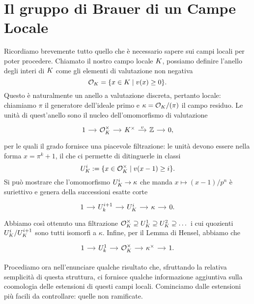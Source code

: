 \section{Il gruppo di Brauer di un Campe Locale}
Ricordiamo brevemente tutto quello che è necessario sapere sui campi locali per poter procedere. Chiamato il nostro campo locale $ K $, possiamo definire l'anello degli interi di $ K $ come gli elementi di valutazione non negativa
\[ \mathcal{O}_{K} = \{ x \in K \mid v(x)\geq 0 \}. \]
Questo è naturalmente un anello a valutazione discreta, pertanto locale: chiamiamo $ \pi $ il generatore dell'ideale primo e $ \kappa = \mathcal{O}_{K}/(\pi) $ il campo residuo. Le unità di quest'anello sono il nucleo dell'omomorfismo di valutazione
\begin{equation}\label{local1}
	\begin{tikzcd}[column sep = small]
	1 \rar
	& \mathcal{O}_{\K}^\times \rar
	& \K^\times \rar["v"]
	& \Z \rar
	& 0,
	\end{tikzcd}
\end{equation}
per le quali il grado fornisce una piacevole filtrazione: le unità devono essere nella forma $ x = \pi^k +1 $, il che ci permette di ditinguerle in classi  $$  U_{K}^i :=\{x \in \mathcal{O}_{K}^\times \mid v(x-1) \geq i \}.  $$ Si può mostrare che l'omomorfismo $ U_{K}^i \to \kappa $ che manda $ x \mapsto (x-1)/p^n $ è suriettivo e genera della successioni esatte corte
\begin{equation}\label{local2}
\begin{tikzcd}[column sep = small]
1 \rar
& U_k^{i+1} \rar
& U_{\K}^i \rar
& \kappa \rar
& 0.
\end{tikzcd}
\end{equation}
Abbiamo così ottenuto una filtrazione $ \mathcal{O}_{K}^\times \supseteq U_{K}^1 \supseteq U_{K}^2 \supseteq \dots $ 
i cui quozienti $ U_{K}^i / U_{K}^{i+1} $ sono tutti isomorfi a $ \kappa $.
Infine, per il Lemma di Hensel, abbiamo che
\begin{equation}\label{local3}
	\begin{tikzcd}[column sep = small]
	1 \rar
	& U_k^{1} \rar
	& \mathcal{O}_{\K}^\times \rar
	& \kappa^\times \rar
	&1.
	\end{tikzcd}
\end{equation}


Procediamo ora nell'enunciare qualche risultato che, sfruttando la relativa semplicità di questa struttura, ci fornisce qualche informazione aggiuntiva sulla coomologia delle estensioni di questi campi locali. Cominciamo dalle estensioni più facili da controllare: quelle non ramificate.

